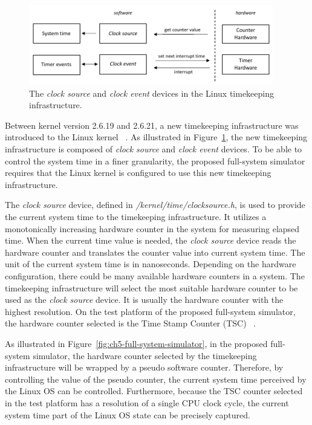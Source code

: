 \begin{figure}[htpb!]
	\centering
	\includegraphics[width=0.95\textwidth]{figures/ch5-clocksource-clockevent.pdf}
	\caption[The \textit{clock source} and \textit{clock event} devices.]{\label{fig:ch5-clocksource-clockevent}The \textit{clock source} and \textit{clock event} devices in the Linux timekeeping infrastructure.}
\end{figure}

Between kernel version 2.6.19 and 2.6.21, a new timekeeping infrastructure was introduced to the Linux kernel~\cite{Stultz:2005} \cite{GleixnerNiehaus:2006} \cite{GleixnerMolnar:2006} \cite{Gleixner:2007} \cite{Kerrisk:2012}. As illustrated in Figure~\ref{fig:ch5-clocksource-clockevent}, the new timekeeping infrastructure is composed of \textit{clock source} and \textit{clock event} devices. To be able to control the system time in a finer granularity, the proposed full-system simulator requires that the Linux kernel is configured to use this new timekeeping infrastructure.

The \textit{clock source} device, defined in \textit{/kernel/time/clocksource.h}, is used to provide the current
system time to the timekeeping infrastructure. It utilizes a monotonically increasing hardware counter in the system for measuring elapsed time. When the current time value is needed, the \textit{clock source} device reads the hardware counter and translates the counter value into current system time. The unit of the current system time is in nanoseconds. Depending on the hardware configuration, there could be many available hardware counters in a system. The timekeeping infrastructure will select the most suitable hardware counter to be used as the \textit{clock source} device. It is usually the hardware counter with the highest resolution. On the test platform of the proposed full-system simulator, the hardware counter selected is the Time Stamp Counter (TSC)~\cite{Intel:1997} \cite{wiki:TSC}.

As illustrated in Figure~\ref{fig:ch5-full-system-simulator}, in the proposed full-system simulator, the hardware counter selected by the timekeeping infrastructure will be wrapped by a pseudo software counter. Therefore, by controlling the value of the pseudo counter, the current system time perceived by the Linux OS can be controlled. Furthermore, because the TSC counter selected in the test platform has a resolution of a single CPU clock cycle, the current system time part of the Linux OS state can be precisely captured.


